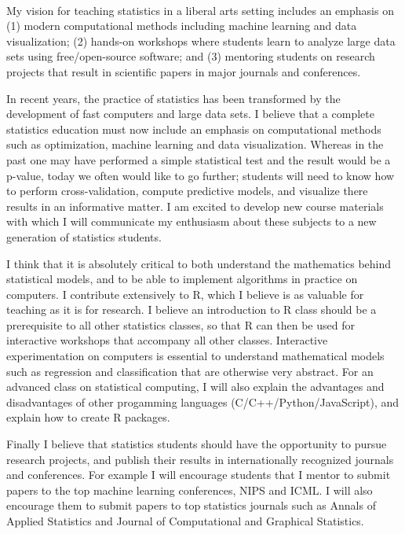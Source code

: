 \documentclass{article}
\begin{document}
\mbox{ }

My vision for teaching statistics in a liberal arts setting includes
an emphasis on (1) modern computational methods including machine
learning and data visualization; (2) hands-on workshops where students
learn to analyze large data sets using free/open-source software; and
(3) mentoring students on research projects that result in scientific
papers in major journals and conferences. 

In recent years, the practice of statistics has been transformed by
the development of fast computers and large data sets. I believe that
a complete statistics education must now include an emphasis on
computational methods such as optimization, machine learning and data
visualization. Whereas in the past one may have performed a simple
statistical test and the result would be a p-value, today we often
would like to go further; students will need to know how to perform
cross-validation, compute predictive models, and visualize there
results in an informative matter. I am excited to develop new course
materials with which I will communicate my enthusiasm about these
subjects to a new generation of statistics students.

I think that it is absolutely critical to both understand the
mathematics behind statistical models, and to be able to implement
algorithms in practice on computers. I contribute extensively to R,
which I believe is as valuable for teaching as it is for research. I
believe an introduction to R class should be a prerequisite to all
other statistics classes, so that R can then be used for interactive
workshops that accompany all other classes. Interactive
experimentation on computers is essential to understand mathematical
models such as regression and classification that are otherwise very
abstract. For an advanced class on statistical computing, I will also
explain the advantages and disadvantages of other progamming languages
(C/C++/Python/JavaScript), and explain how to create R packages.

Finally I believe that statistics students should have the opportunity
to pursue research projects, and publish their results in
internationally recognized journals and conferences. For example I
will encourage students that I mentor to submit papers to the top
machine learning conferences, NIPS and ICML. I will also encourage
them to submit papers to top statistics journals such as Annals of
Applied Statistics and Journal of Computational and Graphical
Statistics. 
\end{document}
